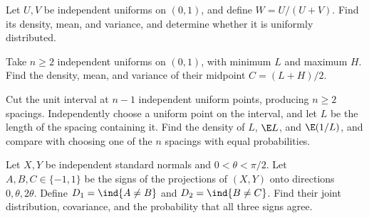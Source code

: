 Let $U,V$ be independent uniforms on $(0,1)$, and define $W=U/(U+V)$. Find its density, mean, and variance, and determine whether it is uniformly distributed.

Take $n\ge2$ independent uniforms on $(0,1)$, with minimum $L$ and maximum $H$. Find the density, mean, and variance of their midpoint $C=(L+H)/2$.

Cut the unit interval at $n-1$ independent uniform points, producing $n\ge2$ spacings. Independently choose a uniform point on the interval, and let $L$ be the length of the spacing containing it. Find the density of $L$, $\E L$, and $\E(1/L)$, and compare with choosing one of the $n$ spacings with equal probabilities.

Let $X,Y$ be independent standard normals and $0<\theta<\pi/2$. Let $A,B,C\in\{-1,1\}$ be the signs of the projections of $(X,Y)$ onto directions $0,\theta,2\theta$. Define $D_1=\ind\{A\ne B\}$ and $D_2=\ind\{B\ne C\}$. Find their joint distribution, covariance, and the probability that all three signs agree.
\par
\endgroup
